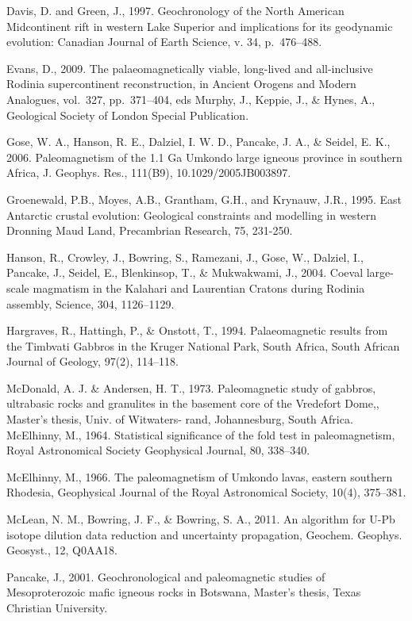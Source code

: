 \documentclass{article}
\begin{document}
Davis, D. and Green, J., 1997. Geochronology of the North American
Midcontinent rift in western Lake Superior and implications for its
geodynamic evolution: Canadian Journal of Earth Science, v. 34,
p.~476--488.

Evans, D., 2009. The palaeomagnetically viable, long-lived and
all-inclusive Rodinia supercontinent reconstruction, in Ancient Orogens
and Modern Analogues, vol.~327, pp.~371--404, eds Murphy, J., Keppie,
J., \& Hynes, A., Geological Society of London Special Publication.

Gose, W. A., Hanson, R. E., Dalziel, I. W. D., Pancake, J. A., \&
Seidel, E. K., 2006. Paleomagnetism of the 1.1 Ga Umkondo large igneous
province in southern Africa, J. Geophys. Res., 111(B9),
10.1029/2005JB003897.

Groenewald, P.B., Moyes, A.B., Grantham, G.H., and Krynauw, J.R., 1995.
East Antarctic crustal evolution: Geological constraints and modelling
in western Dronning Maud Land, Precambrian Research, 75, 231-250.

Hanson, R., Crowley, J., Bowring, S., Ramezani, J., Gose, W., Dalziel,
I., Pancake, J., Seidel, E., Blenkinsop, T., \& Mukwakwami, J., 2004.
Coeval large-scale magmatism in the Kalahari and Laurentian Cratons
during Rodinia assembly, Science, 304, 1126--1129.

Hargraves, R., Hattingh, P., \& Onstott, T., 1994. Palaeomagnetic
results from the Timbvati Gabbros in the Kruger National Park, South
Africa, South African Journal of Geology, 97(2), 114--118.

McDonald, A. J. \& Andersen, H. T., 1973. Paleomagnetic study of
gabbros, ultrabasic rocks and granulites in the basement core of the
Vredefort Dome,, Master's thesis, Univ. of Witwaters- rand,
Johannesburg, South Africa. McElhinny, M., 1964. Statistical
significance of the fold test in paleomagnetism, Royal Astronomical
Society Geophysical Journal, 80, 338--340.

McElhinny, M., 1966. The paleomagnetism of Umkondo lavas, eastern
southern Rhodesia, Geophysical Journal of the Royal Astronomical
Society, 10(4), 375--381.

McLean, N. M., Bowring, J. F., \& Bowring, S. A., 2011. An algorithm for
U-Pb isotope dilution data reduction and uncertainty propagation,
Geochem. Geophys. Geosyst., 12, Q0AA18.

Pancake, J., 2001. Geochronological and paleomagnetic studies of
Mesoproterozoic mafic igneous rocks in Botswana, Master's thesis, Texas
Christian University.
\end{document}
